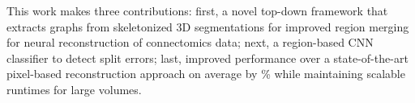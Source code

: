 This work makes three contributions:
first, a novel top-down framework that extracts graphs from skeletonized 3D segmentations for improved region merging for neural reconstruction of connectomics data; 
next, a region-based CNN classifier to detect split errors; 
last, improved performance over a state-of-the-art pixel-based reconstruction approach on average by \% while maintaining scalable runtimes for large volumes.
